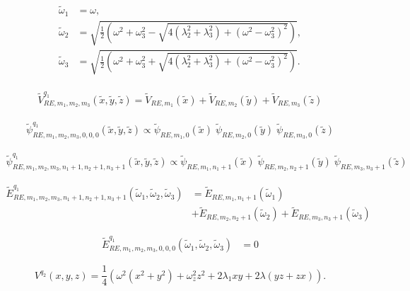 \documentclass[12pt]{article}
\newcommand{\td}[1]{\tilde{#1}}
\begin{document}
\begin{align}\label{3D-omega'-IV}
  \begin{split}
    \td{\omega}_1 &= \omega, \\
    \td{\omega}_2 &= \sqrt{\frac{1}{2}\left(\omega^2+\omega_3^2 - \sqrt{4(\lambda_2^2 + \lambda_3^2) + \left(\omega^2-\omega_3^2\right)^2}\right)}, \\
    \td{\omega}_3 &= \sqrt{\frac{1}{2}\left(\omega^2+\omega_3^2 + \sqrt{4(\lambda_2^2 + \lambda_3^2) + \left(\omega^2-\omega_3^2\right)^2}\right)}.
  \end{split}
\end{align}

\begin{align}
	\td{V}^{q_1}_{RE,m_1,m_2,m_3}(\td{x},\td{y},\td{z})= \td{V}_{RE,m_1}(\td{x})+\td{V}_{RE,m_2}(\td{y})+\td{V}_{RE,m_3}(\td{z})
\end{align}

\begin{align}\nonumber
	\td{\psi}^{q_1}_{RE,m_1,m_2,m_3,0,0,0}(\td{x},\td{y},\td{z})\propto \td{\psi}_{RE,m_1,0}(\td{x})\;
  \td{\psi}_{RE,m_2,0}(\td{y})\; \td{\psi}_{RE,m_3,0}(\td{z})
\end{align}

\begin{align}
	\td{\psi}^{q_1}_{RE,m_1,m_2,m_3,n_1+1,n_2+1,n_3+1}(\td{x},\td{y},\td{z})\propto \td{\psi}_{RE,m_1,n_1+1}(\td{x})\;
  \td{\psi}_{RE,m_2,n_2+1}(\td{y})\; \td{\psi}_{RE,m_3,n_3+1}(\td{z})
\end{align}

\begin{align}\nonumber
	\td{E}^{q_1}_{RE,m_1,m_2,m_3,n_1+1,n_2+1,n_3+1}(\td{\omega}_1,\td{\omega}_2,\td{\omega}_3)&=\td{E}_{RE,m_1,n_1+1}\left(\td{\omega}_1\right)\\
	&+\td{E}_{RE,m_2,n_2+1}\left(\td{\omega}_2\right)+\td{E}_{RE,m_3,n_3+1}\left(\td{\omega}_3\right)
\end{align}

\begin{align}
	\td{E}^{q_1}_{RE,m_1,m_2,m_3,0,0,0}(\td{\omega}_1,\td{\omega}_2,\td{\omega}_3)&=0
\end{align}

  

\begin{equation}
  V^{q_2}(x,y,z)=\frac{1}{4}\left(\omega^2(x^2+y^2)+\omega_z^2z^2+2\lambda_1xy+2\lambda(yz+ zx)\right).
\end{equation}
\end{document}
